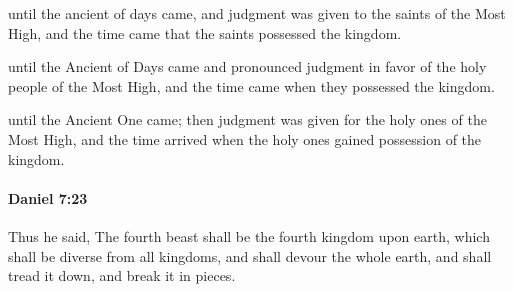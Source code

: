 			\begin{versebox}
					\item[BHS] 
					\item[LXX] 
					\item[ASV] until the ancient of days came, and judgment was given to the saints of the Most High, and the time came that the saints possessed the kingdom.
					\item[NIV] until the Ancient of Days came and pronounced judgment in favor of the holy people of the Most High, and the time came when they possessed the kingdom.
					\item[NRSV] until the Ancient One came; then judgment was given for the holy ones of the Most High, and the time arrived when the holy ones gained possession of the kingdom.
			\end{versebox}

		\paragraph{Daniel 7:23} %
			\label{DANIEL-7-23}

			Thus he said, The fourth beast shall be the fourth kingdom upon earth, which shall be diverse from all kingdoms, and shall devour the whole earth, and shall tread it down, and break it in pieces.

